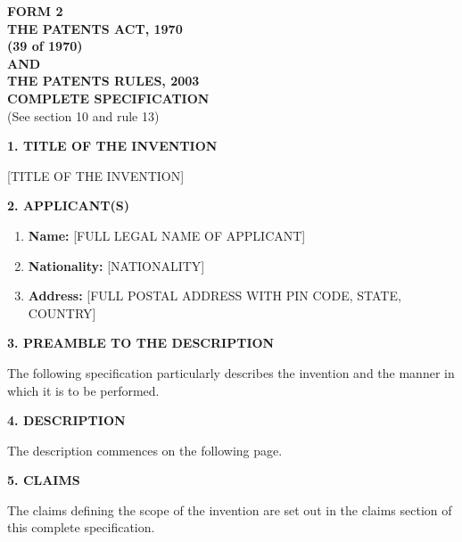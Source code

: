 \documentclass[12pt,a4paper]{article}
\newcommand{\InventionTitle}
{[TITLE OF THE INVENTION]}
\newcommand{\ApplicantName}
{[FULL LEGAL NAME OF APPLICANT]}
\newcommand{\ApplicantNationality}
{[NATIONALITY]}
\newcommand{\ApplicantAddress}
{[FULL POSTAL ADDRESS WITH PIN CODE, STATE, COUNTRY]}
\begin{document}

\begin{center}
    \textbf{\Large FORM 2}\\[6pt]
    \textbf{THE PATENTS ACT, 1970}\\
    \textbf{(39 of 1970)}\\[4pt]
    \textbf{AND}\\[4pt]
    \textbf{THE PATENTS RULES, 2003}\\[8pt]
    \textbf{COMPLETE SPECIFICATION}\\[4pt]
    (See section 10 and rule 13)
\end{center}

\vspace{8mm}

\textbf{1. TITLE OF THE INVENTION}

\InventionTitle

\vspace{4mm}

\textbf{2. APPLICANT(S)}

\begin{enumerate}[label=(\alph*)]
    \item \textbf{Name:} \ApplicantName
    \item \textbf{Nationality:} \ApplicantNationality
    \item \textbf{Address:} \ApplicantAddress
\end{enumerate}


\vspace{4mm}

\textbf{3. PREAMBLE TO THE DESCRIPTION}

The following specification particularly describes the
invention and the manner in which it is to be performed.

\vspace{5mm}

\textbf{4. DESCRIPTION}

The description commences on the following page.

\vspace{3mm}

\textbf{5. CLAIMS}

The claims defining the scope of the invention are set out
in the claims section of this complete specification.
\end{document}
